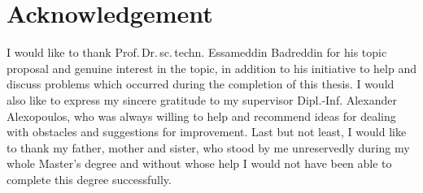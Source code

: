 \section*{Acknowledgement}

I would like to thank Prof.\,Dr.\,sc.\,techn. Essameddin Badreddin for his topic proposal and genuine interest in the topic, in addition to his initiative to help and discuss problems which occurred during the completion of this thesis. I would also like to express my sincere gratitude to my supervisor Dipl.-Inf. Alexander Alexopoulos, who was always willing to help and recommend ideas for dealing with obstacles and suggestions for improvement. Last but not least, I would like to thank my father, mother and sister, who stood by me unreservedly during my whole Master's degree and without whose help I would not have been able to complete this degree successfully.
